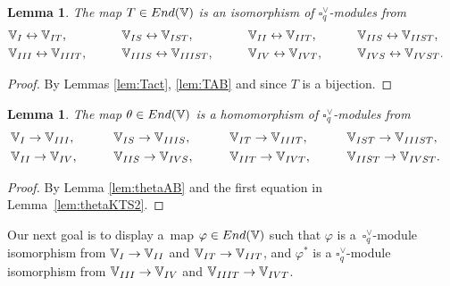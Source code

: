 \documentclass[11pt]{article}
\numberwithin{equation}{section}
\numberwithin{equation}{section}
\newtheorem{Lemma}[Theorem]{Lemma}
\begin{document}
{\begin{Lemma}\label{lem:TIso}The map $T \in {\rm End}(\mathbb V)$ is an isomorphism of $\square^\vee_q$-modules from
\begin{alignat*}{5}
&
\mathbb V_{\rm I} \leftrightarrow \mathbb V_{\rm IT}, \qquad &&
\mathbb V_{\rm IS} \leftrightarrow\mathbb V_{\rm IST}, \qquad &&
\mathbb V_{\rm II} \leftrightarrow \mathbb V_{\rm IIT}, \qquad &&
\mathbb V_{\rm IIS} \leftrightarrow \mathbb V_{\rm IIST},&
\\
&\mathbb V_{\rm III} \leftrightarrow \mathbb V_{\rm IIIT}, \qquad &&
\mathbb V_{\rm IIIS} \leftrightarrow \mathbb V_{\rm IIIST}, \qquad &&
\mathbb V_{\rm IV} \leftrightarrow \mathbb V_{\rm IVT}, \qquad &&
\mathbb V_{\rm IVS} \leftrightarrow \mathbb V_{\rm IVST}.&
\end{alignat*}
\end{Lemma}
\begin{proof} By Lemmas \ref{lem:Tact}, \ref{lem:TAB} and since $T$ is a bijection.
\end{proof}

\begin{Lemma}\label{lem:thetamix} The map $\theta \in {\rm End}(\mathbb V)$ is a homomorphism of $\square^\vee_q$-modules from
\begin{alignat*}{5}
&
\mathbb V_{\rm I} \rightarrow \mathbb V_{\rm III}, \qquad &&
\mathbb V_{\rm IS} \rightarrow \mathbb V_{\rm IIIS}, \qquad &&
\mathbb V_{\rm IT} \rightarrow\mathbb V_{\rm IIIT}, \qquad &&
\mathbb V_{\rm IST} \rightarrow \mathbb V_{\rm IIIST},&
\\
&\mathbb V_{\rm II} \rightarrow \mathbb V_{\rm IV}, \qquad &&
\mathbb V_{\rm IIS} \rightarrow \mathbb V_{\rm IVS}, \qquad &&
\mathbb V_{\rm IIT} \rightarrow \mathbb V_{\rm IVT}, \qquad &&
\mathbb V_{\rm IIST} \rightarrow \mathbb V_{\rm IVST}.&
\end{alignat*}
\end{Lemma}
\begin{proof} By Lemma \ref{lem:thetaAB} and the first equation in Lemma~\ref{lem:thetaKTS2}.
\end{proof}

Our next goal is to display a~map $\varphi \in {\rm End}(\mathbb V)$ such that $\varphi$ is a~$\square^\vee_q$-module isomorphism from $\mathbb V_{\rm I}\to \mathbb V_{\rm II}$ and $\mathbb V_{\rm IT}\to \mathbb V_{\rm IIT}$, and $\varphi^*$ is a $\square^\vee_q$-module isomorphism from $\mathbb V_{\rm III}\to \mathbb V_{\rm IV}$ and $\mathbb V_{\rm IIIT}\to \mathbb V_{\rm IVT}$.

}
\end{document}
